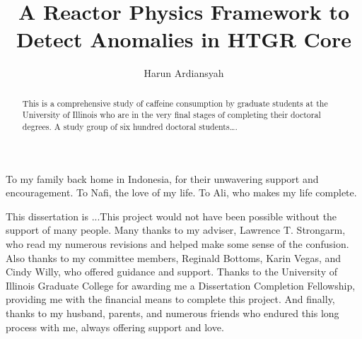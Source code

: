 \documentclass{uiucthesis2021}
\begin{document}
\title{A Reactor Physics Framework to Detect Anomalies in HTGR Core}
\author{Harun Ardiansyah}
\phdthesis
{}
\maketitle

\frontmatter



\begin{abstract}
This is a comprehensive study of caffeine consumption by graduate
students at the University of Illinois who are in the very final
stages of completing their doctoral degrees. A study group of six
hundred doctoral students\ldots.
\end{abstract}

\begin{dedication}
To my family back home in Indonesia, for their unwavering support and encouragement. To Nafi, the love of my life. To Ali, who makes my life complete.
\end{dedication}

\begin{acknowledgments}
This dissertation is ...This project would not have been possible without the support of
many people. Many thanks to my adviser, Lawrence T. Strongarm, who
read my numerous revisions and helped make some sense of the
confusion. Also thanks to my committee members, Reginald Bottoms,
Karin Vegas, and Cindy Willy, who offered guidance and support.
Thanks to the University of Illinois Graduate College for awarding
me a Dissertation Completion Fellowship, providing me with the
financial means to complete this project. And finally, thanks to
my husband, parents, and numerous friends who endured this long
process with me, always offering support and love.
\end{acknowledgments}

{
    \hypersetup{linkcolor=black}  %
    \tableofcontents
}
\end{document}
